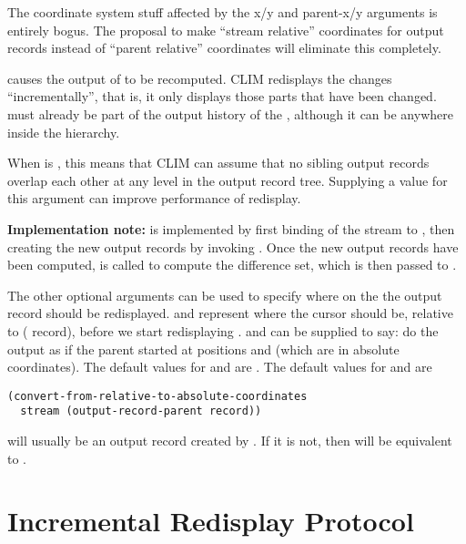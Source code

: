  {The coordinate system stuff affected by the x/y and parent-x/y
arguments is entirely bogus.  The proposal to make ``stream relative''
coordinates for output records instead of ``parent relative'' coordinates will
eliminate this completely.}

 causes the output of
 to be recomputed.
CLIM redisplays the changes ``incrementally'', that is, it only displays those
parts that have been changed.  must already be part of the output
history of the  , although it can be
anywhere inside the hierarchy.

When  is , this means that CLIM can assume
that no sibling output records overlap each other at any level in the output
record tree.  Supplying a  value for this argument can improve
performance of redisplay.

{\bf Implementation note:}  is implemented by first
binding  of the stream to , then creating
the new output records by invoking .  Once the
new output records have been computed,  is called to
compute the difference set, which is then passed to
.

The other optional arguments can be used to specify where on the 
the output record should be redisplayed.   and  represent where
the cursor should be, relative to ( record), before we
start redisplaying .   and  can be
supplied to say: do the output as if the parent started at positions
 and  (which are in absolute coordinates).  The
default values for  and  are .  The default values for  and  are

\begin{verbatim}
(convert-from-relative-to-absolute-coordinates 
  stream (output-record-parent record))
\end{verbatim}

 will usually be an output record created by .
If it is not, then  will be equivalent to
.


\section {Incremental Redisplay Protocol}

